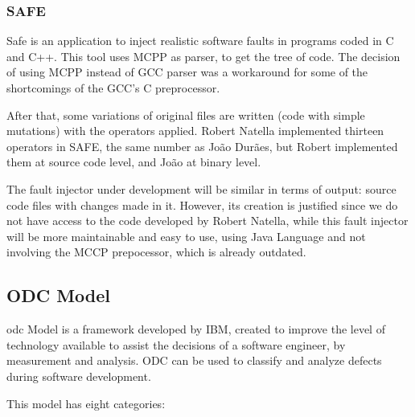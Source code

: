 \subsubsection{SAFE}

Safe is an application to inject realistic software faults in programs coded in C and C++.
This tool uses MCPP as parser, to get the tree of code. The decision of using MCPP instead of GCC parser was a workaround for some of the shortcomings of the GCC's C preprocessor.

After that, some variations of original files are written (code with simple mutations) with the operators applied.
Robert Natella implemented thirteen operators in SAFE, the same number as João Durães\cite{duraes2006emulation}, but Robert implemented them at source code level, and João at binary level.

The fault injector under development will be similar in terms of output: source code files with changes made in it. However, its creation is justified since we do not have access to the code developed by Robert Natella, while this fault injector will be more maintainable and easy to use, using Java Language and not involving the MCCP prepocessor, which is already outdated.\\


\clearpage
\subsection{ODC Model}
\acl{odc}\cite{bridge1998orthogonal} Model is a framework developed by IBM\cite{chillarege2004orthogonal}, created to improve the level of technology available to assist the decisions of a software engineer, by measurement and analysis.
ODC can be used to classify and analyze defects during software development.

This model has eight categories:

